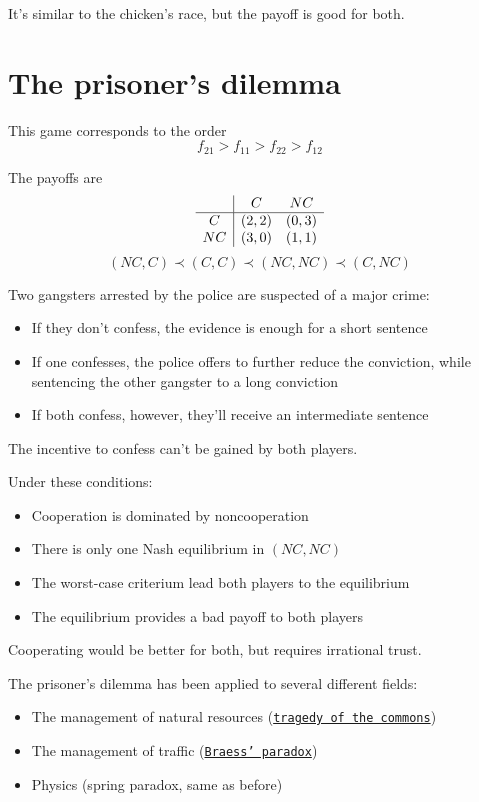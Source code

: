 It's similar to the chicken's race, but the payoff is good for both.

\section{The prisoner's dilemma}

This game corresponds to the order 
$$ f_{21} > f_{11} > f_{22} > f_{12} $$

The payoffs are
$$
\begin{array}{c | c c}
	& C & NC \\
	\hline
	C & (2,2) & (0, 3) \\
	NC & (3,0) & (1,1)
\end{array}
$$
$$ (NC, C) \prec (C, C) \prec (NC, NC) \prec (C, NC) $$

Two gangsters arrested by the police are suspected of a major crime: 
\begin{itemize}
	\item If they don't confess, the evidence is enough for a short sentence
	
	\item If one confesses, the police offers to further reduce the conviction, while sentencing the other gangster to a long conviction
	
	\item If both confess, however, they'll receive an intermediate sentence
\end{itemize}
The incentive to confess can't be gained by both players.

Under these conditions: 
\begin{itemize}
	\item Cooperation is dominated by noncooperation
	
	\item There is only one Nash equilibrium in $(NC, NC)$
	
	\item The worst-case criterium lead both players to the equilibrium
	
	\item The equilibrium provides a bad payoff to both players
\end{itemize}
Cooperating would be better for both, but requires irrational trust.

The prisoner's dilemma has been applied to several different fields: 
\begin{itemize}
	\item The management of natural resources (\href{https://en.wikipedia.org/wiki/Tragedy_of_the_commons}{\texttt{tragedy of the commons}})
	
	\item The management of traffic (\href{https://en.wikipedia.org/wiki/Braess%27_paradox}{\texttt{Braess' paradox}})
	
	\item Physics (spring paradox, same as before)
\end{itemize}

